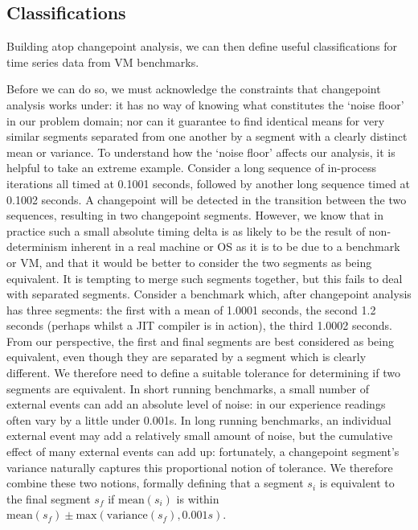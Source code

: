 \documentclass[acmsmall]{acmart}\settopmatter{printfolios=true}
\begin{document}
\subsection{Classifications}
\label{sec:classifications}

Building atop changepoint analysis, we can then define useful classifications
for time series data from VM benchmarks.

Before we can do so, we must
acknowledge the constraints that changepoint analysis works under: it has
no way of knowing what constitutes the `noise floor' in our problem domain; nor can it
guarantee to find identical means for very similar segments separated from
one another by a segment with a clearly distinct mean or variance.
To understand how the `noise floor' affects our analysis, it
is helpful to take an extreme example. Consider a long sequence of in-process
iterations all timed at 0.1001 seconds, followed by another long sequence timed
at 0.1002 seconds. A changepoint will be detected in the transition between the
two sequences, resulting in two changepoint segments. However, we know that in practice such a small absolute timing
delta is as likely to be the result of non-determinism inherent in a real
machine or OS as it is to be due to a benchmark or VM, and that it would be
better to consider the two segments as being equivalent. It is tempting to merge such segments
together, but this fails to deal with separated segments. Consider a
benchmark which, after changepoint analysis has three segments: the first with a
mean of 1.0001 seconds, the second 1.2 seconds (perhaps whilst a JIT compiler is
in action), the third 1.0002 seconds. From our perspective, the first and final
segments are best considered as being equivalent, even though they are separated by a
segment which is clearly different. We therefore need to define a suitable tolerance
for determining if two segments are equivalent. In short running benchmarks, a
small number of external events can add an absolute level of noise: in our
experience readings often vary by a
little under 0.001s. In long running benchmarks, an individual external
event may add a relatively small amount of noise, but the cumulative
effect of many external events can add up: fortunately, a changepoint segment's variance
naturally captures this proportional notion of tolerance. We therefore combine these two notions,
formally defining that a segment $s_i$
is equivalent to the final segment $s_f$ if $\textrm{mean}(s_i)$
is within $\textrm{mean}(s_f) \pm \textrm{max}(\textrm{variance}(s_f), 0.001s)$.
\end{document}
